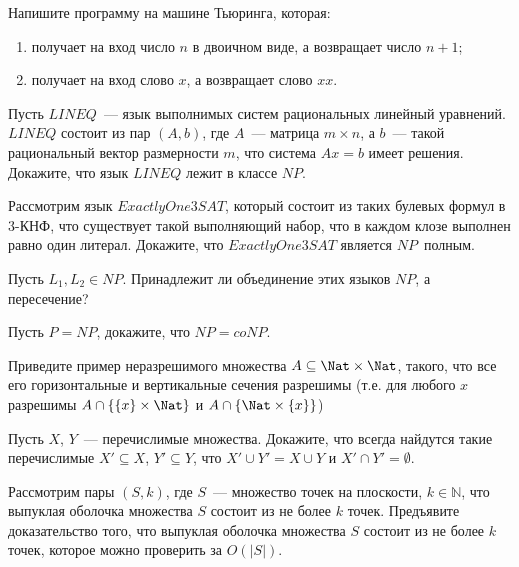 \setcounter{curtask}{13}


\begin{task}
    Напишите программу на машине Тьюринга, которая:
    \begin{enumerate}
		\item получает на вход число $n$ в двоичном виде, а возвращает число
    		$n + 1$;
        \item получает на вход слово $x$, а возвращает слово $xx$.
    \end{enumerate}
\end{task}

\begin{task}
    Пусть $LINEQ$~--- язык выполнимых систем рациональных линейный уравнений. $LINEQ$
    состоит из пар $(A, b)$, где $A$~--- матрица $m \times n$, а $b$~--- такой
    рациональный вектор размерности $m$, что система $Ax = b$ имеет
    решения. Докажите, что язык $LINEQ$ лежит в классе $NP$.
\end{task}

\begin{task}
    Рассмотрим язык $Exactly One 3SAT$, который состоит из таких булевых формул в
    $3$-КНФ, что существует такой выполняющий набор, что в каждом клозе выполнен
    равно один литерал. Докажите, что $Exactly One 3SAT$ является $NP$~полным.
\end{task}

\begin{task}
    Пусть $L_1, L_2 \in NP$. Принадлежит ли объединение этих языков $NP$, а
    пересечение?
\end{task}

\begin{task}
    Пусть $P = NP$, докажите, что $NP = coNP$.
\end{task}

\breakline

\begin{ptask}{9}
    Приведите пример неразрешимого множества $A \subseteq \Nat \times \Nat$,
    такого, что все его горизонтальные и вертикальные сечения
    разрешимы (т.е. для любого $x$ разрешимы $A \cap \{\{x\} \times \Nat\}$
    и $A \cap \{\Nat \times \{x\}\}$)
\end{ptask}

\begin{ptask}{10}
    Пусть $X$, $Y$~--- перечислимые множества. Докажите, что всегда
    найдутся такие перечислимые $X' \subseteq X$, $Y' \subseteq Y$,
    что $X' \cup Y' = X \cup Y$ и $X' \cap Y' = \emptyset$.
\end{ptask}

\begin{ptask}{12}
    Рассмотрим пары $(S, k)$, где $S$~--- множество точек на плоскости, $k
    \in \mathbb{N}$, что выпуклая оболочка множества $S$ состоит из не более $k$
    точек. Предъявите доказательство того, что выпуклая оболочка множества $S$
    состоит из не более $k$ точек, которое можно проверить за $O(|S|)$.
\end{ptask}